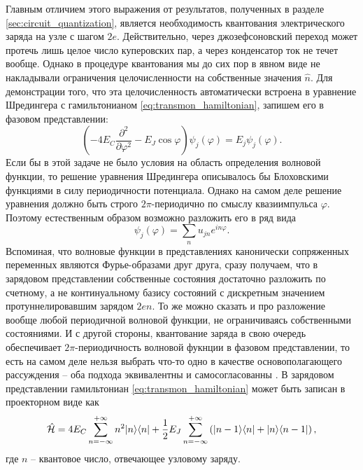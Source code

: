 \documentclass[14pt, a4paper]{extreport}
\DeclarePairedDelimiter\bra{\langle}{\rvert}
\DeclarePairedDelimiter\ket{\lvert}{\rangle}
\numberwithin{equation}{section}
\begin{document}
Главным отличием этого выражения от результатов, полученных в разделе \ref{sec:circuit_quantization}, является необходимость квантования электрического заряда на узле с шагом $2e$. Действительно, через джозефсоновский переход может протечь лишь целое число куперовских пар, а через конденсатор ток не течет вообще. Однако в процедуре квантования мы до сих пор в явном виде не накладывали ограничения целочисленности на собственные значения $\hat n$. Для демонстрации того, что эта целочисленность автоматически встроена в уравнение Шредингера с гамильтонианом \eqref{eq:transmon_hamiltonian}, запишем его в фазовом представлении:
\begin{equation}
	\left(- 4 E_C \frac{\partial^2}{\partial \varphi^2} - E_J \cos \varphi\right)\psi_j(\varphi) = E_j \psi_j(\varphi).\label{eq:transmon_shroedinger_varphi}
\end{equation}
Если бы в этой задаче не было условия на область определения волновой функции, то решение уравнения Шредингера описывалось бы Блоховскими функциями в силу периодичности потенциала. Однако на самом деле решение уравнения должно быть строго $2\pi$-периодично по смыслу квазиимпульса $\varphi$. Поэтому естественным образом возможно разложить его в ряд вида
\begin{equation}
	\psi_j (\varphi) = \sum_n u_{jn} e^{i n \varphi}.
\end{equation}
Вспоминая, что волновые функции в представлениях канонически сопряженных переменных являются Фурье-образами друг друга, сразу получаем, что в зарядовом представлении собственные состояния достаточно разложить по счетному, а не континуальному базису состояний с дискретным значением протуннелировавшим зарядом $2en$. То же можно сказать и про разложение вообще любой периодичной волновой функции, не ограничиваясь собственными состояниями. И с другой стороны, квантование заряда в свою очередь обеспечивает $2\pi$-периодичность волновой фукнции в фазовом представлении, то есть на самом деле нельзя выбрать что-то одно в качестве основополагающего рассуждения -- оба подхода эквивалентны и самосогласованны \cite{thuneberg2013, devoret1995quantum}. В зарядовом представлении гамильтониан \eqref{eq:transmon_hamiltonian} может быть записан в проекторном виде как \cite{devoret1995quantum}
\begin{equation}
	\hat{\mathcal{H}} = 4 E_C \sum_{n=-\infty}^{+\infty} n^2 \ket{n}\bra{n} + \frac{1}{2}E_J \sum_{n=-\infty}^{+\infty} \left( \ket{n-1}\bra{n} + \ket{n}\bra{n-1} \right),\label{eq:transmon_shroedinger_n}
\end{equation}
где $n$ -- квантовое число, отвечающее узловому заряду.
\end{document}
